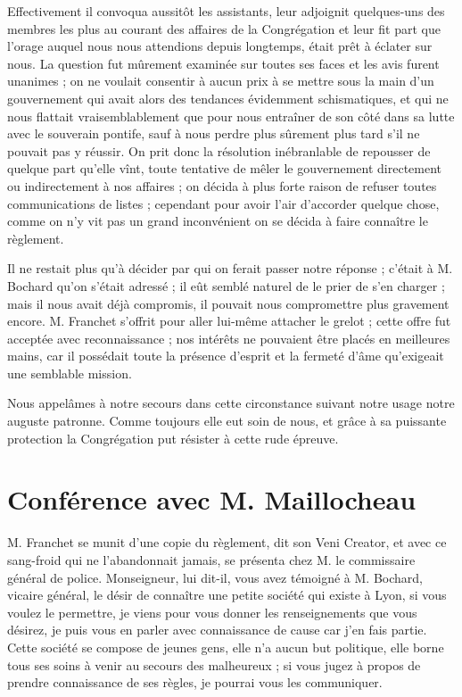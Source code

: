 Effectivement il convoqua aussitôt les assistants, leur adjoignit quelques-uns des membres les plus au courant des affaires de la Congrégation et leur fit part que l'orage auquel nous nous attendions depuis longtemps, était prêt à éclater sur nous. La question fut mûrement examinée sur toutes ses faces et les avis furent unanimes ; on ne voulait consentir à aucun prix à se mettre sous la main d'un gouvernement qui avait alors
des tendances évidemment schismatiques, et qui ne nous flattait vraisemblablement que pour nous entraîner de son côté dans sa lutte avec le souverain pontife, sauf à nous perdre plus sûrement plus tard s'il ne pouvait pas y réussir. On prit donc la résolution inébranlable de repousser de quelque part qu'elle vînt, toute tentative de mêler le gouvernement directement ou indirectement à nos affaires ; on décida à plus forte raison de refuser toutes communications de listes ; cependant pour avoir l'air d'accorder quelque chose, comme on n'y vit pas un grand inconvénient on se décida à faire connaître le règlement.

Il ne restait plus qu'à décider par qui on ferait passer notre réponse ; c'était à M. Bochard qu'on s'était adressé ; il eût semblé naturel de le prier de s'en charger ; mais il nous avait déjà compromis, il pouvait nous compromettre plus gravement encore. M. Franchet s'offrit pour aller lui-même attacher le grelot ; cette offre fut acceptée avec reconnaissance ; nos intérêts ne pouvaient être placés en meilleures mains, car il possédait toute la présence d'esprit et la fermeté d'âme qu'exigeait une semblable mission.

Nous appelâmes à notre secours dans cette circonstance suivant notre usage notre auguste patronne. Comme toujours elle eut soin de nous, et grâce à sa puissante protection la Congrégation put résister à cette rude épreuve.

\section*{Conférence avec M. Maillocheau}
M. Franchet se munit d'une copie du règlement, dit son Veni Creator, et avec ce sang-froid qui ne l'abandonnait jamais, se présenta chez M. le commissaire général de police. Monseigneur, lui dit-il, vous avez témoigné à M. Bochard, vicaire général, le désir de connaître une petite société qui existe à Lyon,
si vous voulez le permettre, je viens pour vous donner les renseignements que vous désirez, je puis vous en parler avec connaissance de cause car j'en fais partie. Cette société se compose de jeunes gens, elle n'a aucun but politique, elle borne tous ses soins à venir au secours des malheureux ; si vous jugez à propos de prendre connaissance de ses règles, je pourrai vous les communiquer.

